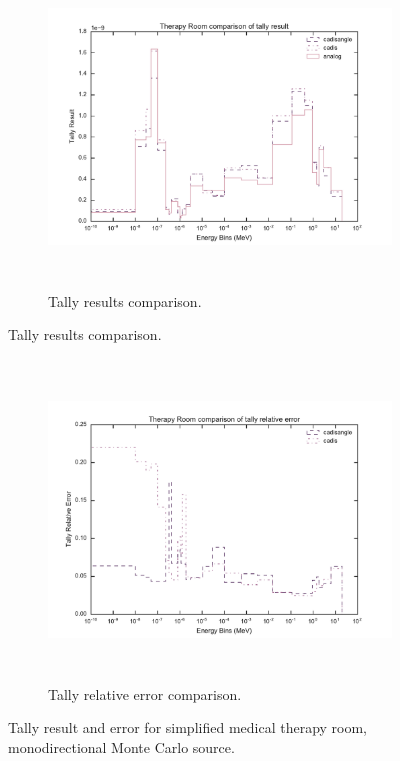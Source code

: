 \begin{figure}[htb!]
  \centering
  \begin{subfigure}[t]{\textwidth}
    \centering
    \includegraphics[height=8.5cm]{./chapters/characterization_probs/figures/char/therapy/therapy_room_tally_result_compare.pdf}
    \caption[Tally results comparison.]
    {Tally results comparison.}
    \label{fig:monotherapyresult}
  \end{subfigure}
\end{figure}
\begin{figure}[htb!]\ContinuedFloat
  \centering
  \begin{subfigure}[t]{\textwidth}
    \centering
    \includegraphics[height=8.5cm]{./chapters/characterization_probs/figures/char/therapy/therapy_room_tally_error_compare.pdf}
    \caption[Tally relative error comparison.]
    {Tally relative error comparison.}
    \label{fig:monotherapyerror}
  \end{subfigure}
\caption[Tally result and error for simplified medical therapy room,
  monodirectional Monte Carlo source]
  {Tally result and error for simplified medical therapy room, monodirectional
  Monte Carlo source.}
\label{fig:monotherapyresults}
\end{figure}

